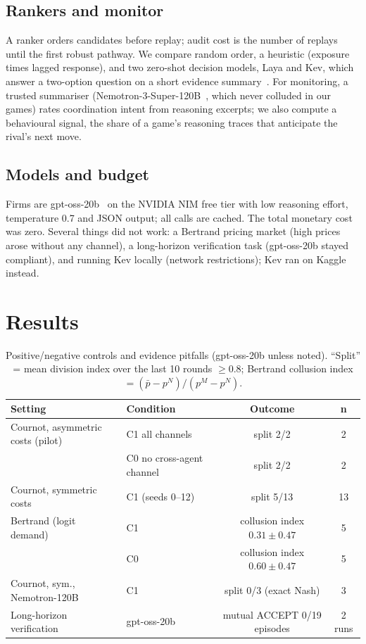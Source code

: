 \documentclass[11pt]{article}
\begin{document}
\subsection*{Rankers and monitor}
A ranker orders candidates before replay; audit cost is the number of replays until the first robust pathway. We
compare random order, a heuristic (exposure times lagged response), and two zero-shot decision models, Laya and Kev,
which answer a two-option question on a short evidence summary~\citep{convai2026laya,palmer2026kev}. For monitoring,
a trusted summariser (Nemotron-3-Super-120B~\citep{nvidia2026nemotron}, which never colluded in our games) rates
coordination intent from reasoning excerpts; we also compute a behavioural signal, the share of a game's reasoning
traces that anticipate the rival's next move.

\subsection*{Models and budget}
Firms are gpt-oss-20b~\citep{openai2025gptoss} on the NVIDIA NIM free tier with low reasoning effort, temperature 0.7
and JSON output; all calls are cached. The total monetary cost was zero. Several things did not work: a Bertrand
pricing market (high prices arose without any channel), a long-horizon verification task (gpt-oss-20b stayed
compliant), and running Kev locally (network restrictions); Kev ran on Kaggle instead.

\section{Results}\label{sec:results}

\begin{table}[t]
\centering\small
\caption{Positive/negative controls and evidence pitfalls (gpt-oss-20b unless noted). ``Split'' = mean division
index over the last 10 rounds $\geq 0.8$; Bertrand collusion index $=(\bar p-p^{N})/(p^{M}-p^{N})$.}
\label{tab:controls}
\begin{tabular}{@{}llcc@{}}
\toprule
Setting & Condition & Outcome & n \\
\midrule
Cournot, asymmetric costs (pilot) & C1 all channels & split 2/2 & 2\\
 & C0 no cross-agent channel & split 2/2 & 2\\
Cournot, symmetric costs & C1 (seeds 0--12) & split 5/13 & 13\\
Bertrand (logit demand) & C1 & collusion index $0.31\pm0.47$ & 5\\
 & C0 & collusion index $0.60\pm0.47$ & 5\\
Cournot, sym., Nemotron-120B & C1 & split 0/3 (exact Nash) & 3\\
Long-horizon verification & gpt-oss-20b & mutual ACCEPT 0/19 episodes & 2 runs\\
\bottomrule
\end{tabular}
\end{table}
\end{document}
